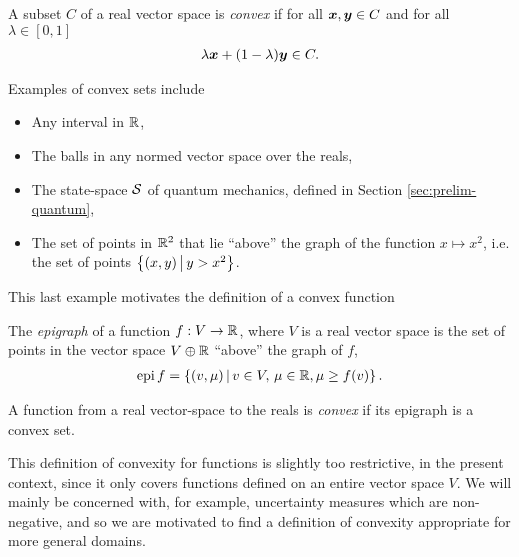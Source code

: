 \begin{defn}\label{defn:convex-set}
  A subset $C$ of a real vector space is \emph{convex} if for all $\bm{x},\bm{y}\in C$ and for all $\lambda\in [0,1]$
  \begin{align}
    \lambda \bm{x} + (1-\lambda)\bm{y}\in C.
  \end{align}
\end{defn}
Examples of convex sets include
\begin{itemize}
  \item Any interval in $\mathbb{R}$,
  \item The balls in any normed vector space over the reals,
  \item The state-space $\dops$ of quantum mechanics, defined in Section \ref{sec:prelim-quantum},
  \item The set of points in $\mathbb{R}^2$ that lie ``above'' the graph of the function $x\mapsto x^2$, i.e. the set of points $\left\{(x,y)\,\middle|\,y > x^2\right\}$.
\end{itemize}
This last example motivates the definition of a convex function
\begin{defn}\label{defn:epigraph}
  The \emph{epigraph} of a function $f:V\to\mathbb{R}$, where $V$ is a real vector space is the set of points in the vector space $V\oplus \mathbb{R}$ ``above'' the graph of $f$,
  \begin{align}
    \operatorname{epi} f = \left\{(v, \mu)\,\middle|\,v\in V,\, \mu\in\mathbb{R}, \mu \geq f(v)\right\}.
  \end{align}
\end{defn}
\begin{defn}\label{defn:real-convex-function}
  A function from a real vector-space to the reals is \emph{convex} if its epigraph is a convex set.
\end{defn}
This definition of convexity for functions is slightly too restrictive, in the present context, since it only covers functions defined on an entire vector space $V$. We will mainly be concerned with, for example, uncertainty measures which are non-negative, and so we are motivated to find a definition of convexity appropriate for more general domains.

